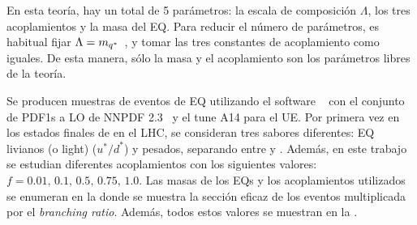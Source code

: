 En esta teoría, hay un total de 5 parámetros: la escala de composición \(\Lambda\), los tres acoplamientos y la masa del \ac{EQ}. Para reducir el número de parámetros, es habitual fijar \(\Lambda = m_{q^*}\)~\cite{Zhan_Li_Liu_Li-2016}, y tomar las tres constantes de acoplamiento como iguales. De esta manera, sólo la masa y el acoplamiento son los parámetros libres de la teoría.

Se producen muestras de eventos de \ac{EQ} utilizando el software ~\cite{Pythia8.2} con el conjunto de \acp{PDF1} a \ac{LO} de NNPDF 2.3~\cite{NNPDF2} y el tune A14 para el \ac{UE}.
Por primera vez en los estados finales de \gammajet en el \ac{LHC}, se consideran tres sabores diferentes: \ac{EQ} livianos (o light) \qstar (\(u^* / d^*\)) y pesados, separando entre \cstar y \bstar. Además, en este trabajo se estudian diferentes acoplamientos con los siguientes valores: \(f = 0.01, \, 0.1, \, 0.5, \, 0.75, \, 1.0\). Las masas de los \acp{EQ} y los acoplamientos utilizados se enumeran en la \Tab{\ref{tab:samples:samples:sig:qstar:xs}} donde se muestra la sección eficaz de los eventos multiplicada por el \textit{branching ratio}. Además, todos estos valores se muestran en la \Fig{\ref{tab:samples:samples:sig:qstar:xs}}.



